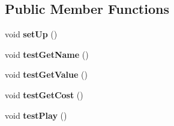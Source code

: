 \subsection*{\-Public \-Member \-Functions}
\begin{DoxyCompactItemize}
\item 
\hypertarget{classdominion_1_1model_1_1VictoryCardTest_a55050c8f51079bdcfa2c50d983a4ef07}{void {\bfseries set\-Up} ()}\label{classdominion_1_1model_1_1VictoryCardTest_a55050c8f51079bdcfa2c50d983a4ef07}

\item 
\hypertarget{classdominion_1_1model_1_1VictoryCardTest_a0c161bbf19eb63b9942716f730fd9f5c}{void {\bfseries test\-Get\-Name} ()}\label{classdominion_1_1model_1_1VictoryCardTest_a0c161bbf19eb63b9942716f730fd9f5c}

\item 
\hypertarget{classdominion_1_1model_1_1VictoryCardTest_a6c14fbb7b186fa96de068ba9a8b2d923}{void {\bfseries test\-Get\-Value} ()}\label{classdominion_1_1model_1_1VictoryCardTest_a6c14fbb7b186fa96de068ba9a8b2d923}

\item 
\hypertarget{classdominion_1_1model_1_1VictoryCardTest_a0cd4d765d7c77d1315f1fbdf6069c48f}{void {\bfseries test\-Get\-Cost} ()}\label{classdominion_1_1model_1_1VictoryCardTest_a0cd4d765d7c77d1315f1fbdf6069c48f}

\item 
\hypertarget{classdominion_1_1model_1_1VictoryCardTest_a5a53f8dcfcec83e105413b9fe160275a}{void {\bfseries test\-Play} ()}\label{classdominion_1_1model_1_1VictoryCardTest_a5a53f8dcfcec83e105413b9fe160275a}

\end{DoxyCompactItemize}
